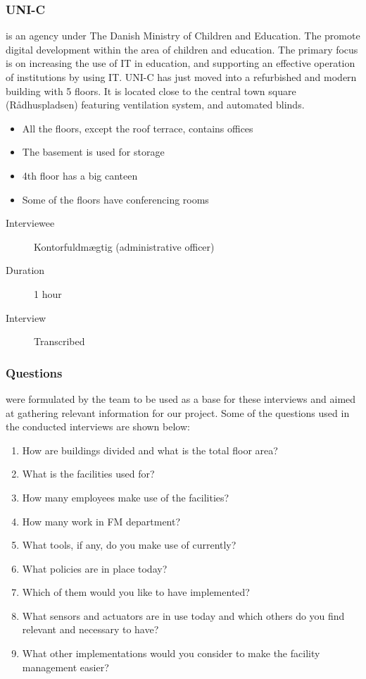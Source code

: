 \subsubsection{UNI-C} is an agency under The Danish Ministry of Children and Education. The promote digital development within the area of children and education. The primary focus is on increasing the use of IT in education, and supporting an effective operation of institutions by using IT. UNI-C has just moved into a refurbished and modern building with 5 floors. It is located close to the central town square (R\aa dhuspladsen) featuring ventilation system, and automated blinds.
\begin{itemize}
	\item All the floors, except the roof terrace, contains offices
	\item The basement is used for storage
	\item 4th floor has a big canteen
	\item Some of the floors have conferencing rooms
\end{itemize}
\begin{description}
	\item[Interviewee] Kontorfuldmægtig (administrative officer)
	\item[Duration] 1 hour
	\item[Interview] Transcribed
\end{description}

\subsubsection{Questions} were formulated by the team to be used as a base for these interviews and aimed at gathering relevant information for our project. Some of the questions used in the conducted interviews are shown below:
\begin{enumerate}
	\item How are buildings divided and what is the total floor area?
	\item What is the facilities used for? 
	\item How many employees make use of the facilities?
	\item How many work in FM department?
	\item What tools, if any, do you make use of currently?
	\item What policies are in place today?
	\item Which of them would you like to have implemented?
	\item What sensors and actuators are in use today and which others do you find relevant and necessary to have?
	\item What other implementations would you consider to make the facility management easier?
\end{enumerate}

